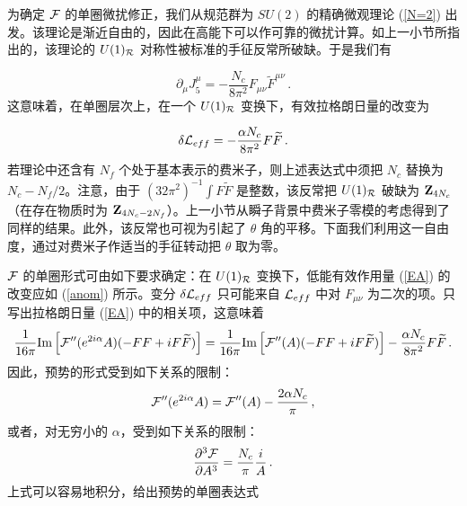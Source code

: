 为确定 ${\cal F}$ 的单圈微扰修正，我们从规范群为 $SU(2)$ 的精确微观理论 (\ref{N=2}) 出发。该理论是渐近自由的，因此在高能下可以作可靠的微扰计算。如上一小节所指出的，该理论的 $U(1)_{\cal R}$ 对称性被标准的手征反常所破缺。于是我们有

$$
\partial_\mu J^\mu_5= -\frac{N_c}{8\pi^2}F_{\mu\nu}\widetilde
F^{\mu\nu} \,.
$$
这意味着，在单圈层次上，在一个 $U(1)_{\cal R}$ 变换下，有效拉格朗日量的改变为

\begin{equation}
\delta {\cal L}_{eff}= - \frac{\alpha N_c}{8\pi^2} F\widetilde F\,.
\label{anom}
\end{equation}
若理论中还含有 $N_f$ 个处于基本表示的费米子，则上述表达式中须把 $N_c$ 替换为 $N_c-N_f/2$。注意，由于 $(32\pi^2)^{-1}\int F\widetilde F$ 是整数，该反常把 $U(1)_{\cal R}$ 破缺为 ${\bf Z}_{4N_c}$（在存在物质时为 ${\bf Z}_{4N_c-2N_f}$）。上一小节从瞬子背景中费米子零模的考虑得到了同样的结果。此外，该反常也可视为引起了 $\theta$ 角的平移。下面我们利用这一自由度，通过对费米子作适当的手征转动把 $\theta$ 取为零。



${\cal F}$ 的单圈形式可由如下要求确定：在 $U(1)_{\cal R}$ 变换下，低能有效作用量 (\ref{EA}) 的改变应如 (\ref{anom}) 所示。变分 $\delta{\cal L}_{eff}$ 只可能来自 ${\cal L}_{eff}$ 中对 $F_{\mu\nu}$ 为二次的项。只写出拉格朗日量 (\ref{EA}) 中的相关项，这意味着
$$ 
\frac{1}{16\pi}{\rm Im}\left[{\cal F}''(e^{2i\alpha}A)(-FF + iF
\widetilde F)\right] = \frac{1}{16\pi}{\rm Im}\left[{\cal F}''(A)
(-FF+iF\widetilde F)\right]-\frac{\alpha N_c}{8\pi^2}F\widetilde F\,.
$$ 
因此，预势的形式受到如下关系的限制：
$$
{\cal F}''(e^{2i\alpha}A)={\cal F}''(A) - \frac{2\alpha N_c}{\pi}\,,
$$
或者，对无穷小的 $\alpha$，受到如下关系的限制：
$$
\frac{\partial^3 {\cal F}}{\partial A^3}=\frac{N_c}{\pi}\frac{i}{A}\,.
$$
上式可以容易地积分，给出预势的单圈表达式

